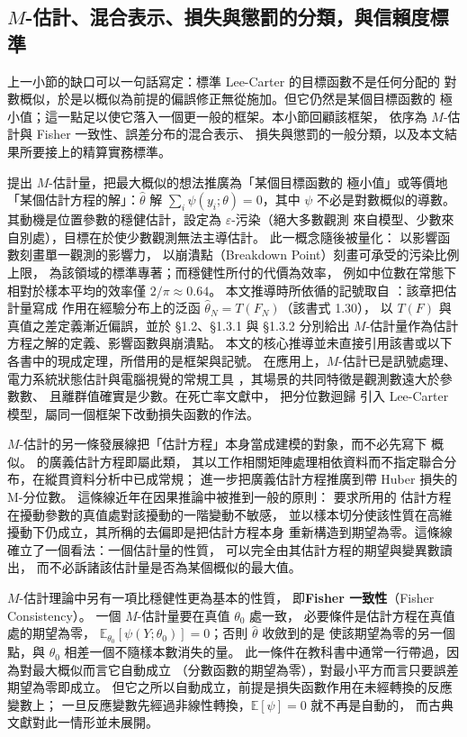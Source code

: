 \documentclass[UTF8, fontset=macnew, a4paper, 12pt]{ctexart}
\newcommand{\Ex}{\mathbb{E}}
\begin{document}
\subsection{$M$-估計、混合表示、損失與懲罰的分類，與信賴度標準}\label{subsec:mest}\label{subsec:mix}\label{subsec:mq}\label{subsec:cred}

上一小節的缺口可以一句話寫定：標準 Lee-Carter 的目標函數不是任何分配的
對數概似，於是以概似為前提的偏誤修正無從施加。但它仍然是某個目標函數的
極小值；這一點足以使它落入一個更一般的框架。本小節回顧該框架，
依序為 $M$-估計與 Fisher 一致性、誤差分布的混合表示、
損失與懲罰的一般分類，以及本文結果所要接上的精算實務標準。

\citet{huber1964} 提出 $M$-估計量，把最大概似的想法推廣為「某個目標函數的
極小值」或等價地「某個估計方程的解」：$\hat\theta$ 解
$\sum_i\psi(y_i;\theta)=0$，其中 $\psi$ 不必是對數概似的導數。
其動機是位置參數的穩健估計，設定為 $\varepsilon$-污染（絕大多數觀測
來自模型、少數來自別處），目標在於使少數觀測無法主導估計。
此一概念隨後被量化：\citet{hampel1974} 以影響函數刻畫單一觀測的影響力，
\citet{donoho1983} 以崩潰點（Breakdown Point）刻畫可承受的污染比例上限，
\citet{huber2009} 為該領域的標準專著；而穩健性所付的代價為效率，
例如中位數在常態下相對於樣本平均的效率僅 $2/\pi\approx0.64$。
本文推導時所依循的記號取自 \citet[第 1 章]{zoubir2018}：該章把估計量寫成
作用在經驗分布上的泛函 $\hat\theta_N=T(F_N)$（該書式 1.30），
以 $T(F)$ 與真值之差定義漸近偏誤，並於 §1.2、§1.3.1 與 §1.3.2 分別給出
$M$-估計量作為估計方程之解的定義、影響函數與崩潰點。
本文的核心推導並未直接引用該書或以下各書中的現成定理，所借用的是框架與記號。
在應用上，$M$-估計已是訊號處理、電力系統狀態估計與電腦視覺的常規工具
\citep{zoubir2018}，其場景的共同特徵是觀測數遠大於參數數、
且離群值確實是少數。在死亡率文獻中，\citet{santolino2020} 把分位數迴歸
引入 Lee-Carter 模型，屬同一個框架下改動損失函數的作法。

$M$-估計的另一條發展線把「估計方程」本身當成建模的對象，而不必先寫下
概似。\citet{liang1986} 的廣義估計方程即屬此類，
其以工作相關矩陣處理相依資料而不指定聯合分布，在縱貫資料分析中已成常規；
\citet{merlo2022} 進一步把廣義估計方程推廣到帶 Huber 損失的 M-分位數。
這條線近年在因果推論中被推到一般的原則：\citet{chernozhukov2018} 要求所用的
估計方程在擾動參數的真值處對該擾動的一階變動不敏感，
並以樣本切分使該性質在高維擾動下仍成立，其所稱的去偏即是把估計方程本身
重新構造到期望為零。這條線確立了一個看法：一個估計量的性質，
可以完全由其估計方程的期望與變異數讀出，
而不必訴諸該估計量是否為某個概似的最大值。

$M$-估計理論中另有一項比穩健性更為基本的性質，
即\textbf{Fisher 一致性}（Fisher Consistency）。
一個 $M$-估計量要在真值 $\theta_0$ 處一致，
必要條件是估計方程在真值處的期望為零，
$\Ex_{\theta_0}[\psi(Y;\theta_0)]=0$；否則 $\hat\theta$ 收斂到的是
使該期望為零的另一個點，與 $\theta_0$ 相差一個不隨樣本數消失的量。
此一條件在教科書中通常一行帶過，因為對最大概似而言它自動成立
（分數函數的期望為零），對最小平方而言只要誤差期望為零即成立。
但它之所以自動成立，前提是損失函數作用在未經轉換的反應變數上；
一旦反應變數先經過非線性轉換，$\Ex[\psi]=0$ 就不再是自動的，
而古典文獻對此一情形並未展開。
\end{document}
